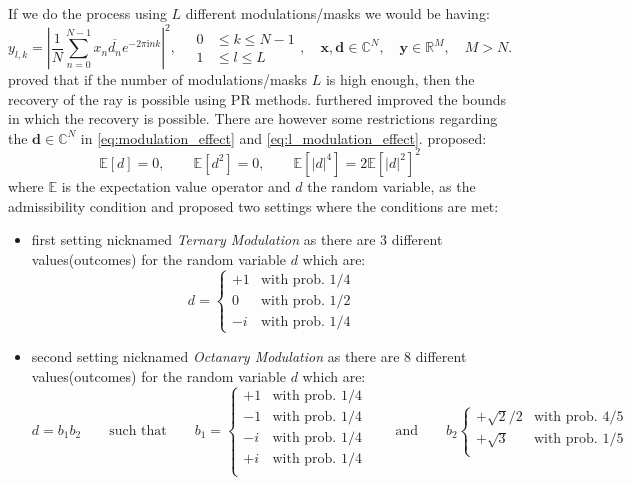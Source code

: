 If we do the process using $L$ different modulations/masks we would be having:
\begin{equation}\label{eq:l_modulation_effect}
	y_{l,k} = \left| \frac{1}{N}\sum_{n=0}^{N-1} x_n\overline{d_n} e^{-2\pi\mathrm{i}nk} \right|^2, \quad \begin{split}
	0 &\leq k \leq N-1\\
	1 &\leq l \leq L
	\end{split}
  , \quad \boldsymbol{x}, \boldsymbol{d} \in \mathbb{C}^N , \quad \boldsymbol{y} \in \mathbb{R}^M, \quad M > N 
  .
  \end{equation}
\cite{ECXLMS2013} proved that if the number of modulations/masks $L$ is high enough, then the recovery of the ray is possible using \acl*{PR} methods. 
\cite{Gross2017} furthered improved the bounds in which the recovery is possible.
There are however some restrictions regarding the $\boldsymbol{d} \in \mathbb{C}^N$ in \cref{eq:modulation_effect} and \cref{eq:l_modulation_effect}. \cite{ECXLMS2013} proposed:
\begin{equation}
	\mathbb{E}\left[d\right] = 0, \qquad \mathbb{E}\left[d^2\right] = 0, \qquad\mathbb{E}\left[\left|d\right|^4\right] = 2\mathbb{E}\left[\left|d\right|^2\right]^2
\end{equation}
where $\mathbb{E}$ is the expectation value operator and $d$ the random variable, as the admissibility condition and proposed two settings where the conditions are met:
\begin{itemize}
	\item first setting nicknamed \emph{Ternary Modulation} as there are 3 different values(outcomes) for the random variable $d$ which are:
	\begin{equation}
	  d =
		  \begin{cases}
			  +1 & \text{with prob.  $1/4$}\\
			  0 & \text{with prob.  $1/2$}\\
			  -i & \text{with prob.  $1/4$}
		  \end{cases}  
	\end{equation}
	\item second setting nicknamed \emph{Octanary Modulation} as there are 8 different values(outcomes) for the random variable $d$ which are:
	\begin{equation}\label{eq:octanary_modulation}
		d = b_1b_2 \qquad \text{such that} \qquad
	  b_1 =
		  \begin{cases}
			  +1 & \text{with prob.  $1/4$}\\
			  -1 & \text{with prob.  $1/4$}\\
			  -i & \text{with prob.  $1/4$}\\
			  +i & \text{with prob.  $1/4$}\\
	
		  \end{cases}  
		  \qquad \text{and} \qquad 
	  b_2 
		  \begin{cases}  
			+\sqrt{2}/2 & \text{with prob.  $4/5$}\\
			+\sqrt{3} & \text{with prob.  $1/5$}\\
		\end{cases}   
	\end{equation}
\end{itemize}
